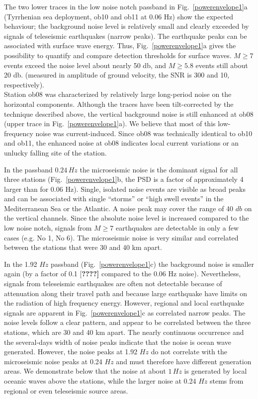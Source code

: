 \documentclass{article}
\providecommand{\remark}[1]{{\typeout{REMARK (p.\arabic{page}): #1}[\bf #1]}}
\begin{document}
{The two lower traces in the low noise notch passband 
in Fig.~\ref{powerenvelope1}a (Tyrrhenian sea deployment, 
ob10 and ob11 at $0.06$ Hz)
show the expected behaviour; 
the background noise level is relatively small and clearly exceeded
by signals of teleseismic earthquakes (narrow peaks). 
The earthquake peaks can be associated with surface wave energy.
Thus,  Fig.~\ref{powerenvelope1}a gives 
the possibility to quantify and compare detection 
thresholds for surface waves. 
$M \geq 7$ events exceed the noise level about nearly 50 db, 
and 
$M \geq 5.8$ events still about 20 db.
(measured in amplitude of ground velocity, the SNR is 
300 and 10, respectively). 
\\
Station ob08
was characterized by relatively large long-period noise on the 
horizontal components. 
Although the traces have been tilt-corrected by the technique described 
above, the vertical background noise is still enhanced at ob08
(upper trace in Fig.~\ref{powerenvelope1}a).
We believe that most of this low-frequency noise was current-induced.
Since ob08 was 
technically identical to ob10 and ob11, 
the enhanced noise at ob08 
indicates local current variations 
or an unlucky falling site of the station.

In the passband $0.24\, Hz$  
the microseismic noise is the 
dominant signal for all three stations
(Fig.~\ref{powerenvelope1}b, 
the PSD is a factor of approximately 4 larger than for 0.06 Hz). 
Single, isolated noise events are visible as broad peaks and can be associated 
with single ``storms'' or ``high swell events'' in the 
Mediterranean Sea or the Atlantic.
A noise peak may cover the range of 40 $db$ on the vertical channels.
Since the absolute noise level is increased compared to the low noise notch, 
signals from $M \geq 7$ earthquakes are detectable in only a few cases
 (e.g. No 1, No 6).
The microseismic noise is very similar and  
correlated between the stations that were 30 and 
40 km apart.


In the 1.92 $Hz$ passband  
(Fig.~\ref{powerenvelope1}c)
the background noise is  smaller again (by a factor of 0.1
\remark{????} compared to the 0.06 Hz noise).
Nevertheless,
signals from teleseismic earthquakes are 
often not detectable because of attenuation
along their travel path 
and because
large earthquake have 
limits on the radiation of high frequency energy.
However, regional and local earthquake signals are apparent 
in Fig.~\ref{powerenvelope1}c as correlated narrow peaks.
The noise levels follow a clear 
pattern,
and appear to be correlated between the three stations, which are 30 and 40 km apart.
The nearly continuous occurrence and the several-days width
of noise peaks indicate that the noise
is ocean wave generated. 
However, the noise peaks at 1.92 $Hz$ do not correlate with the 
microseismic noise peaks 
at 0.24 $Hz$ and must therefore have different generation areas.
We demonstrate below that the noise at about $1\, Hz$ 
is generated by local oceanic waves above the stations, 
while the larger noise at 
0.24 $Hz$ stems from regional or even teleseismic source areas.

}
\end{document}
